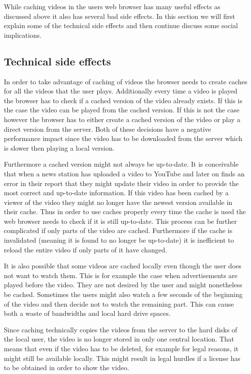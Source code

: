 While caching videos in the users web browser has many useful effects as discussed above it also has several bad side effects. In this section we will first explain some of the technical side effects and then continue discuss some social implications. 

\subsection{Technical side effects}
In order to take advantage of caching of videos the browser needs to create caches for all the videos that the user plays. Additionally every time a video is played the browser has to check if a cached version of the video already exists. If this is the case the video can be played from the cached version. If this is not the case however the browser has to either create a cached version of the video or play a direct version from the server.  Both of these decisions have a negative performance impact since the video has to be downloaded from the server which is slower then playing a local version. 

Furthermore a cached version might not always be up-to-date. It is conceivable that when a news station has uploaded a video to YouTube and later on finds an error in their report that they might update their video in order to provide the most correct and up-to-date information. If this video has been cached by a viewer of the video they might no longer have the newest version available in their cache. Thus in order to use caches properly every time the cache is used the web browser needs to check if it is still up-to-date. This process can be further complicated if only parts of the video are cached. Furthermore if the cache is invalidated (meaning it is found to no longer be up-to-date) it is inefficient to reload the entire video if only parts of it have changed. 

It is also possible that some videos are cached locally even though the user does not want to watch them. This is for example the case when advertisements are played before the video. They are not desired by the user and might nonetheless be cached. Sometimes the users might also watch a few seconds of the beginning of the video and then decide not to watch the remaining part. This can cause both a waste of bandwidths and local hard drive spaces. 

Since caching technically copies the videos from the server to the hard disks of the local user, the video is no longer stored in only one central location. That means that even if the video has to be deleted, for example for legal reasons, it might still be available locally. This might result in legal hurdles if a license has to be obtained in order to show the video. 

